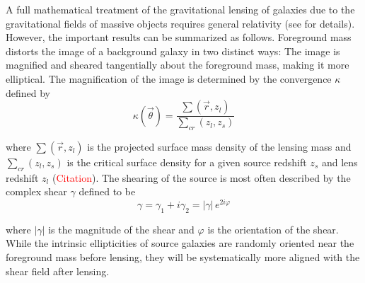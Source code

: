 \documentclass[%
 reprint,
 amsmath,amssymb,
 aps,nofootinbib
]{revtex4-1}
\begin{document}

A full mathematical treatment of the gravitational lensing of galaxies due to the gravitational fields of massive objects requires general relativity (see \cite{modern_cosmology} for details). However, the important results can be summarized as follows. Foreground mass distorts the image of a background galaxy in two distinct ways: The image is magnified and sheared tangentially about the foreground mass, making it more elliptical. The magnification of the image is determined by the convergence $\kappa$ defined by
\begin{equation}\label{convergence}
\kappa(\vec{\theta})=\frac{\sum(\vec{r},z_l)}{\sum_{cr}(z_l,z_s)}
\end{equation}

\noindent where $\sum(\vec{r},z_l)$ is the projected surface mass density of the lensing mass and $\sum_{cr}(z_l,z_s)$ is the critical surface density for a given source redshift $z_s$ and lens redshift $z_l$ (\textcolor{red}{Citation}). The shearing of the source is most often described by the complex shear $\gamma$ defined to be
\begin{equation}\label{complex_shear}
\gamma=\gamma_1+i\gamma_2=|\gamma|\,e^{2i\varphi}
\end{equation}

\noindent where $|\gamma|$ is the magnitude of the shear and $\varphi$ is the orientation of the shear. While the intrinsic ellipticities of source galaxies are randomly oriented near the foreground mass before lensing, they will be systematically more aligned with the shear field after lensing.%
\end{document}
